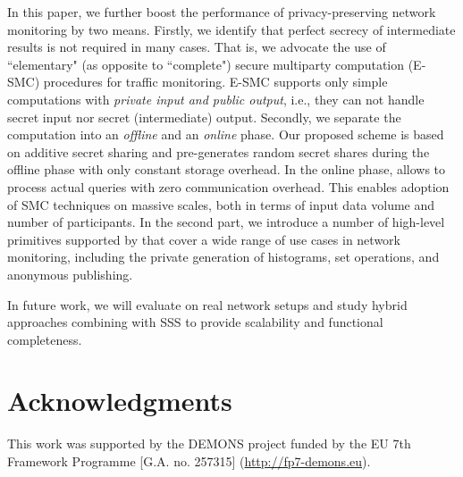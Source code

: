 \documentclass{sig-alternate}
\begin{document}
In this paper, we further boost the performance of privacy-preserving network monitoring by two means. Firstly, we identify that perfect secrecy of intermediate results is not required in many cases.
That is, we advocate the use of ``elementary" (as opposite to ``complete") secure multiparty computation (E-SMC) procedures for traffic monitoring. E-SMC supports only simple computations with {\em private input and public output}, i.e., they can not handle secret input nor secret (intermediate) output. 
Secondly, we separate the computation into an \emph{offline} and an \emph{online} phase. 
Our proposed scheme \ata is based on additive secret sharing and pre-generates  random secret shares during the offline phase with only constant storage overhead. In the online phase, \ata allows to process actual queries with zero communication overhead. This enables adoption of SMC techniques on massive scales, both in terms of input data volume and number of participants. In the second part, we introduce a number of high-level primitives supported by \ata that cover a wide range of use cases in network monitoring, including the private generation of histograms, set operations, and anonymous publishing. 

In future work, we will evaluate \ata on real network setups and study hybrid approaches combining \ata with SSS to provide scalability and functional completeness. \\


\section*{Acknowledgments} 
This work was supported by the DEMONS project funded by  the EU 7th Framework Programme [G.A. no. 257315] (\url{http://fp7-demons.eu}).




\end{document}
